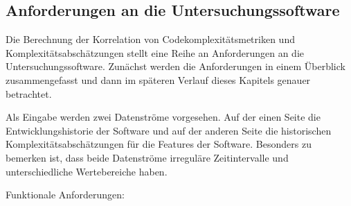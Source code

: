 \subsection{Anforderungen an die Untersuchungssoftware}\label{Anforderungen-an-die-Untersuchungssoftware}

Die Berechnung der Korrelation von Codekomplexitätsmetriken und
Komplexitätsabschätzungen stellt eine Reihe an Anforderungen an die
Untersuchungssoftware. Zunächst werden die Anforderungen in einem
Überblick zusammengefasst und dann im späteren Verlauf dieses Kapitels
genauer betrachtet.

Als Eingabe werden zwei Datenströme vorgesehen. Auf der einen Seite die
Entwicklungshistorie der Software und auf der anderen Seite die
historischen Komplexitätsabschätzungen für die Features der Software.
Besonders zu bemerken ist, dass beide Datenströme irreguläre
Zeitintervalle und unterschiedliche Wertebereiche haben.

Funktionale Anforderungen:

